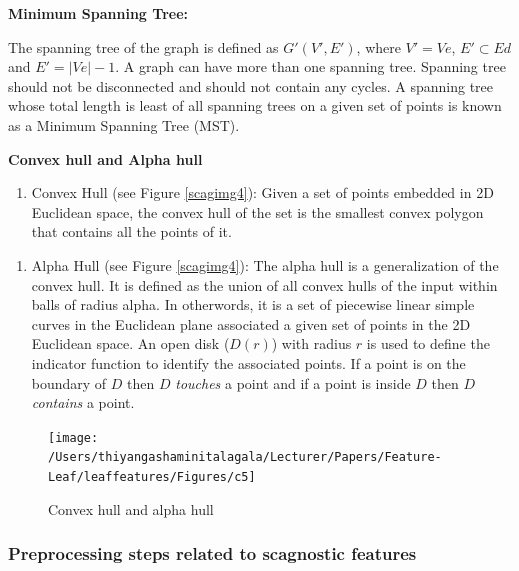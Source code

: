 \documentclass{article}
\begin{document}
\textbf{Minimum Spanning Tree:}

The spanning tree of the graph is defined as \(G'(V',E')\), where
\(V' = Ve\), \(E' \subset Ed\) and \(E' = |Ve|-1\). A graph can have
more than one spanning tree. Spanning tree should not be disconnected
and should not contain any cycles. A spanning tree whose total length is
least of all spanning trees on a given set of points is known as a
Minimum Spanning Tree (MST).

\textbf{Convex hull and Alpha hull}

\begin{enumerate}
\def\labelenumi{\roman{enumi})}
\tightlist
\item
  Convex Hull (see Figure \ref{scagimg4}): Given a set of points
  embedded in 2D Euclidean space, the convex hull of the set is the
  smallest convex polygon that contains all the points of it.
\end{enumerate}

\begin{enumerate}
\def\labelenumi{\roman{enumi})}
\setcounter{enumi}{1}
\tightlist
\item
  Alpha Hull (see Figure \ref{scagimg4}): The alpha hull is a
  generalization of the convex hull. It is defined as the union of all
  convex hulls of the input within balls of radius alpha. In otherwords,
  it is a set of piecewise linear simple curves in the Euclidean plane
  associated a given set of points in the 2D Euclidean space. An open
  disk (\(D(r)\)) with radius \(r\) is used to define the indicator
  function to identify the associated points. If a point is on the
  boundary of \(D\) then \(D\) \textit{touches} a point and if a point
  is inside \(D\) then \(D\) \textit{contains} a point.
\end{enumerate}

\begin{figure}[!ht]

{\centering \texttt{[image: /Users/thiyangashaminitalagala/Lecturer/Papers/Feature-Leaf/leaffeatures/Figures/c5]} 

}

\caption{\label{scagimg4}Convex hull and alpha hull}\label{fig:unnamed-chunk-32}
\end{figure}

\hypertarget{preprocessing-steps-related-to-scagnostic-features}{%
\subsubsection{Preprocessing steps related to scagnostic
features}\label{preprocessing-steps-related-to-scagnostic-features}}
\end{document}
